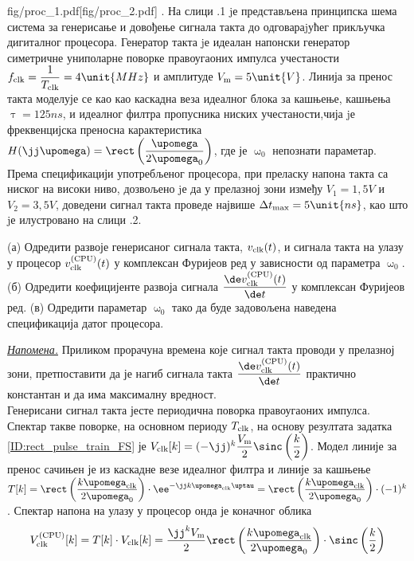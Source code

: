 \newpage
\mnDifficult
\begin{slikaDesno}{fig/proc_1.pdf}[fig/proc_2.pdf]
    \noindent\PID.
    На слици \ID.1 jе представљена принципска шема система за
    генерисање и довођење сигнала такта до одговараjућег прикључка
    дигиталног процесора. Генератор такта jе идеалан напонски
    генератор симетричне униполарне поворке правоугаоних импулса
    учестаности
    $f_{\rm clk} = \dfrac{1}{T_{\rm clk}} = 4\unit{MHz}$
    и амплитуде $V_{\rm m} = 5\unit{V}$. 
    Линија за пренос такта моделује се као као каскадна
    веза идеалног блока за кашњење, кашњења 
    $\uptau = 125\unit{ns}$, и идеалног филтра пропусника ниских учестаности,чија
    jе фреквенцијска преносна карактеристика 
    $H(\jj\upomega) = \rect\left( \dfrac{\upomega}{2\upomega_0} \right)$, где је 
    $\upomega_0$ непознати параметар. 
    Према спецификацији употребљеног процесора, при
    преласку напона такта са ниског на високи ниво, дозвољено jе
    да у прелазној зони између $V_1 = 1,5\unit{V}$ и $V_2 = 3,5\unit{V}$, доведени сигнал такта
    проведе највише 
    $\Delta t_{\rm max} = 5\unit{ns}$, као што jе илустровано на слици \ID.2. 
    \end{slikaDesno}

    (а) Одредити развоје генерисаног сигнала такта, $v_{\rm clk}(t)$, и сигнала такта
    на улазу у процесор $v_{\rm clk}^{\rm(CPU)}(t)$ у комплексан Фуријеов ред у зависности 
    од параметра $\upomega_0$.
    (б) Одредити коефицијенте развоја сигнала $\dfrac{\de v_{\rm clk}^{\rm (CPU)}(t)}{\de t}$ 
    у комплексан Фуријеов ред.  
    (в) Одредити параметар $\upomega_0$ тако да буде задовољена наведена спецификација датог 
    процесора. 

    \underline{\it Напомена.} Приликом прорачуна времена које сигнал такта проводи у 
    прелазној зони, претпоставити да је нагиб сигнала такта 
    $\dfrac{\de v_{\rm clk}^{\rm (CPU)}(t)}{\de t}$ практично константан и да има максималну 
    вредност. \\

    \RESENJE  Генерисани сигнал такта јесте периодична поворка правоугаоних импулса. 
    Спектар такве поворке, на основном периоду $T_{\rm clk}$, на основу резултата задатка 
    \ref{ID:rect_pulse_train_FS} је $V_{\rm clk}[k] = 
    (-\jj)^k \dfrac{V_{\rm m}}{2} \sinc \left(
    \dfrac{k}{2}
    \right) $.
    Модел линије за пренос сачињен је из каскадне везе идеалног филтра и линије за 
    кашњење $T[k] = \rect \left( \dfrac{k{\upomega_{\rm clk}}}{2\upomega_0} \right) 
    \cdot \ee^{-\jj k {\upomega_{\rm clk}\uptau}} = 
    \rect \left( \dfrac{k{\upomega_{\rm clk}}}{2\upomega_0} \right) 
    \cdot (-1)^k$. Спектар напона на улазу у процесор онда је коначног облика 
    \begin{equation}
        V_{\rm clk}^{\rm (CPU)}[k] 
        = T[k] \cdot V_{\rm clk}[k] 
        =  
        \dfrac{\jj^{k} V_{\rm m}}{2}
        \rect \left( \dfrac{k{\upomega_{\rm clk}}}{2\upomega_0} \right) 
        \cdot
        \sinc \left(
        \dfrac{k}{2} \right)
    \end{equation}

